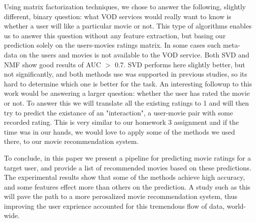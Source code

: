Using matrix factorization techniques, we chose to answer the following, slightly different, binary question: what VOD services would really want to know is whether a user will like a particular movie or not. This type of algorithms enables us to answer this question without any feature extraction, but basing our prediction solely on the users-movies ratings matrix. In some cases such meta-data on the users and movies is not available to the VOD service. Both SVD and NMF show good results of AUC $>$ 0.7. SVD performs here slightly better, but not significantly, and both methods use was supported in previous studies, so its hard to determine which one is better for the task. An interesting followup to this work would be answering a larger question: whether the user has rated the movie or not. To answer this we will translate all the existing ratings to 1 and will then try to predict the existance of an "interaction", a user-movie pair with some recorded rating. This is very similar to our homework 3 assignment and if the time was in our hands, we would love to apply some of the methods we used there, to our movie recommendation system.

To conclude, in this paper we present a pipeline for predicting movie ratings for a target user, and provide a list of recommended movies based on these predictions. The experimental results show that some of the methods achieve high accuracy, and some features effect more than others on the prediction. A study such as this will pave the path to a more perosalized movie recommendation system, thus improving the user exprience accounted for this tremendous flow of data, world-wide.
